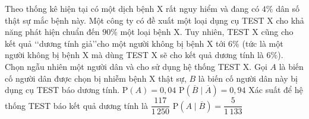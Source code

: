\begin{ex}%
	Theo thống kê hiện tại có một dịch bệnh X rất nguy hiểm và đang có $4\%$ dân số thật sự mắc bệnh này. Một công ty có đề xuất một loại dụng cụ TEST X cho khả năng phát hiện chuẩn đến $90\%$ một loại bệnh X. Tuy nhiên, TEST X cũng cho kết quả \lq\lq dương tính giả\rq\rq cho một người không bị bệnh X tới $6\%$ (tức là một người không bị bệnh X mà dùng TEST X sẽ cho kết quả dương tính là $6\%$). Chọn ngẫu nhiên một người dân và cho sử dụng hệ thống TEST X. Gọi $A$ là biến cố người dân được chọn bị nhiễm bệnh X thật sự, $B$ là biến cố người dân này bị dụng cụ TEST báo dương tính.
	\choiceTF
	{\True $\mathrm{P}(A)=0{,}04$}
	{\True $\mathrm{P}\left(\overline{B} \mid \overline{A}\right)=0{,}94$}
	{\True Xác suất để hệ thống TEST báo kết quả dương tính là $\dfrac{117}{1\,250}$}
	{\True $\mathrm{P}\left(A \mid \overline{B}\right)=\dfrac{5}{1\,133}$}
\end{ex}

